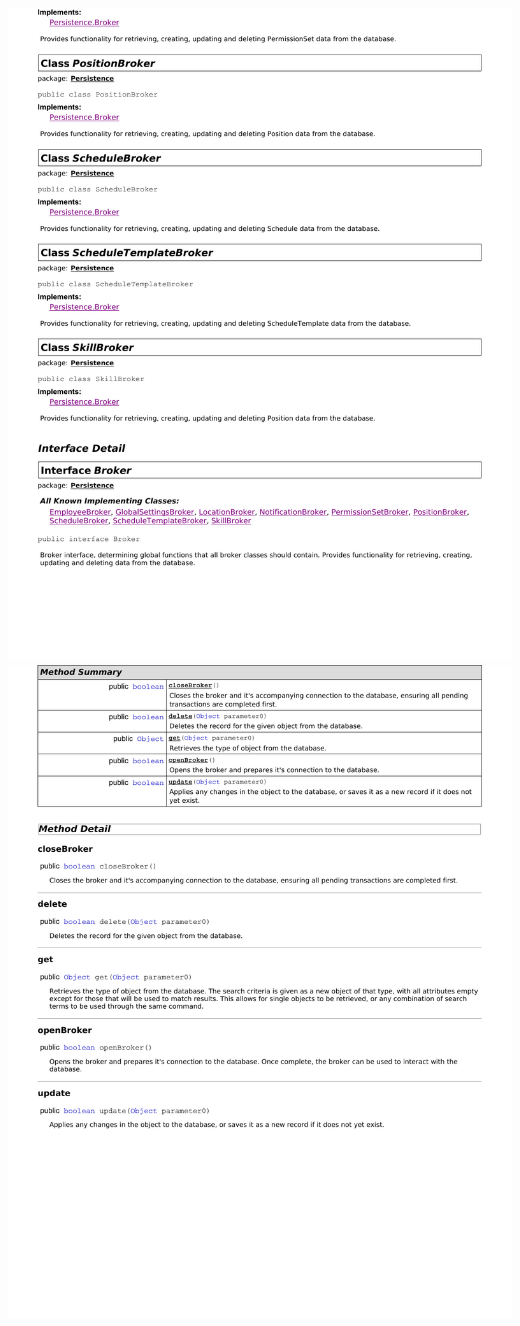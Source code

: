 \documentclass[letterpaper,12pt]{report}
\begin{document}
\includegraphics[scale=0.9,trim=20mm 30mm 25mm 8mm]{externals/dp2.pdf}
\newpage
\includegraphics[scale=0.9,trim=20mm 30mm 25mm 8mm]{externals/dp3.pdf}
\newpage
\end{document}

